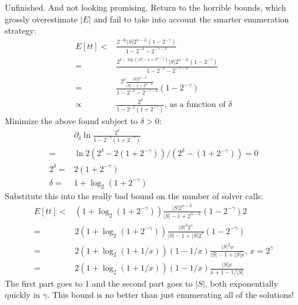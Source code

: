\documentclass{article}
\begin{document}
Unfinished. And not looking promising. Return to the horrible bounds, which grossly overestimate $|E|$ and fail to take into account the smarter enumeration strategy:
\begin{align}
  E[tt] <& \frac{2^{-K}|S|2^{\alpha - L}(1 - 2^{ - \gamma})}{1 - 2^{ - \delta} - 2^{ - \gamma - \delta}}\\
  = &\frac{2^{\delta - \log (|S| - 1 + 2^{\alpha - L})}|S|2^{\alpha - L}(1 - 2^{ - \gamma})}{1 - 2^{ - \delta} - 2^{ - \gamma - \delta}}\\
  = &\frac{2^\delta\frac{|S|2^{\alpha - L}}{|S| - 1 + 2^{\alpha - L}}}{1 - 2^{ - \delta} - 2^{ - \gamma - \delta}}(1 - 2^{ - \gamma})\\
  \propto &\frac{2^\delta}{1 - 2^{ - \delta}(1 + 2^{ - \gamma})}\text{, as a function of $\delta$}
\end{align}
Minimize the above found subject to $\delta > 0$:
\begin{align}
  &\partial_\delta \ln\frac{2^\delta}{1 - 2^{ - \delta}(1 + 2^{ - \gamma})}\\
  = &\ln 2  (2^\delta - 2(1 + 2^{ - \gamma}))/(2^\delta - (1 + 2^{ - \gamma})) =  0\\
  2^\delta =& 2(1 + 2^{ - \gamma})\\
  \delta = &1 + \log_2 (1 + 2^{ - \gamma})
\end{align}
Substitute this into the really bad bound on the number of solver calls:
\begin{align}
  E[tt] < & (1 + \log_2 (1 + 2^{ - \gamma})) \frac{|S|2^{\alpha - L}}{|S| - 1 + 2^{\alpha - L}}(1 - 2^{ - \gamma})2\\
  = &2(1 + \log_2 (1 + 2^{ - \gamma})) \frac{|S|^2 2^\gamma}{|S| - 1 + |S|2^\gamma}(1 - 2^{ - \gamma})\\
  = &2(1 + \log_2 (1 + 1/x)) (1 - 1/x) \frac{|S|^2 x}{|S| - 1 + |S|x}\text{, }x = 2^\gamma\\
   = &2(1 + \log_2 (1 + 1/x)) (1 - 1/x)\frac{|S|x}{x + 1 - 1/|S|}
\end{align}
The first part goes to 1 and the second part goes to $|S|$, both exponentially quickly in $\gamma$. This bound is no better than just enumerating all of the solutions!
\end{document}
